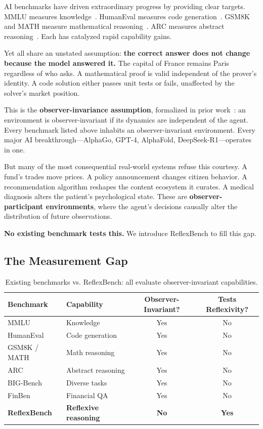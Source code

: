 \documentclass{article}
\begin{document}
AI benchmarks have driven extraordinary progress by providing clear targets. MMLU measures knowledge~\citep{hendrycks2021}. HumanEval measures code generation~\citep{chen2021}. GSM8K and MATH measure mathematical reasoning~\citep{cobbe2021,hendrycks2021math}. ARC measures abstract reasoning~\citep{chollet2019}. Each has catalyzed rapid capability gains.

Yet all share an unstated assumption: \textbf{the correct answer does not change because the model answered it.} The capital of France remains Paris regardless of who asks. A mathematical proof is valid independent of the prover's identity. A code solution either passes unit tests or fails, unaffected by the solver's market position.

This is the \textbf{observer-invariance assumption}, formalized in prior work~\citep{anon2026}: an environment is observer-invariant if its dynamics are independent of the agent. Every benchmark listed above inhabits an observer-invariant environment. Every major AI breakthrough---AlphaGo, GPT-4, AlphaFold, DeepSeek-R1---operates in one.

But many of the most consequential real-world systems refuse this courtesy. A fund's trades move prices. A policy announcement changes citizen behavior. A recommendation algorithm reshapes the content ecosystem it curates. A medical diagnosis alters the patient's psychological state. These are \textbf{observer-participant environments}, where the agent's decisions causally alter the distribution of future observations.

\textbf{No existing benchmark tests this.} We introduce ReflexBench to fill this gap.

\subsection{The Measurement Gap}

\begin{table}[h]
\centering
\caption{Existing benchmarks vs. ReflexBench: all evaluate observer-invariant capabilities.}
\label{tab:benchmark-gap}
\begin{tabular}{@{}llcc@{}}
\toprule
\textbf{Benchmark} & \textbf{Capability} & \textbf{Observer-Invariant?} & \textbf{Tests Reflexivity?} \\
\midrule
MMLU & Knowledge & Yes & No \\
HumanEval & Code generation & Yes & No \\
GSM8K / MATH & Math reasoning & Yes & No \\
ARC & Abstract reasoning & Yes & No \\
BIG-Bench & Diverse tasks & Yes & No \\
FinBen & Financial QA & Yes & No \\
\midrule
\textbf{ReflexBench} & \textbf{Reflexive reasoning} & \textbf{No} & \textbf{Yes} \\
\bottomrule
\end{tabular}
\end{table}
\end{document}
